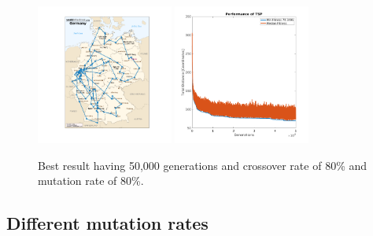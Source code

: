 \documentclass[a4paper, 12pt]{article}
\begin{document}
\begin{figure}[h!]
  \centering
  \includegraphics[width=0.4\textwidth]{images/one_run_cross_80_mut_80_50000_ind.png}
  \includegraphics[width=0.4\textwidth]{images/one_run_cross_80_mut_80_50000.png}
    \caption{Best result having 50,000 generations and crossover rate of 80\% and mutation rate of 80\%. \label{fig:xxx1}}
\end{figure}

\newpage
\subsection{Different mutation rates}
\end{document}
